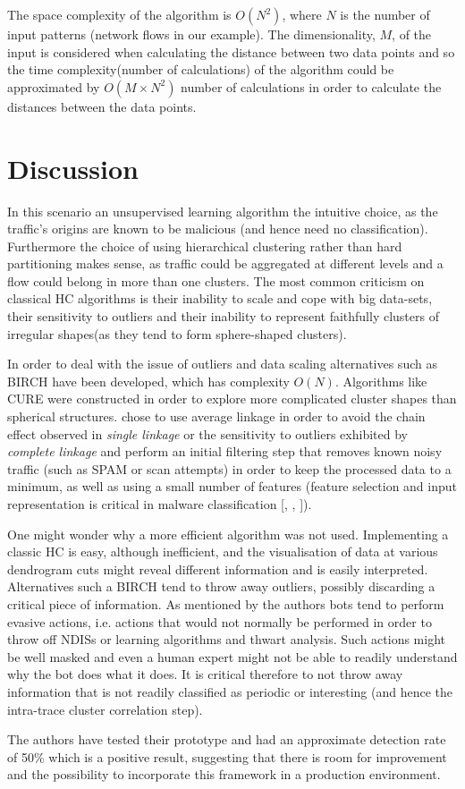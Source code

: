\documentclass[12pt,a4paper,twocolumn]{article}
\begin{document}
	
	The space complexity of the algorithm is $O(N^2)$, where $N$ is the number of input patterns (network flows in our example). The dimensionality, $M$, of the input is considered when calculating the distance between two data points and so the time complexity(number of calculations) of the algorithm  could be approximated by $O(M\times N^2)$ number of calculations in order to calculate the distances between the data points.	
	
	\section{Discussion}
	\label{sec:discussion}
	In this scenario an unsupervised learning algorithm the intuitive choice, as the traffic's origins are known to be malicious (and hence need no classification). Furthermore the choice of using hierarchical clustering rather than hard partitioning makes sense, as traffic could be aggregated at different levels and a flow could belong in more than one clusters. The most common criticism on classical HC algorithms is their inability to scale and cope with big data-sets, their sensitivity to outliers and their inability to represent faithfully clusters of irregular shapes(as they tend to form sphere-shaped clusters).
	
	In order to deal with the issue of outliers and data scaling alternatives such as BIRCH\citep{BIRCH} have been developed, which has complexity $O(N)$. Algorithms like CURE\citep{CURE} were constructed in order to explore more complicated cluster shapes than spherical structures. 	\citeauthor{cavallaro} chose to use average linkage in order to avoid the chain effect observed in \emph{single linkage} or the sensitivity to outliers exhibited by \emph{complete linkage} and perform an initial filtering step that removes known noisy traffic (such as SPAM or scan attempts) in order to keep the processed data to a minimum, as well as using a small number of features (feature selection and input representation is critical in malware classification [\citep{Hou201055}, \citep{IP_classificaton}, \citep{syscalls}]).
	
	One might wonder why a more efficient algorithm was not used. Implementing a classic HC is easy, although inefficient, and the visualisation of data at various dendrogram cuts might reveal different information and is easily interpreted. Alternatives such a BIRCH tend to throw away outliers, possibly discarding a critical piece of information. As mentioned by the authors bots tend to perform evasive actions, i.e. actions that would not normally be performed in order to throw off NDISs or learning algorithms and thwart analysis. Such actions might be well masked and even a human expert might not be able to readily understand why the bot does what it does. It is critical therefore to not throw away information that is not readily classified as periodic or interesting (and hence the intra-trace cluster correlation step).

The authors have tested their prototype and had an approximate detection rate of 50\% which is a positive result, suggesting that there is room for improvement and the possibility to incorporate this framework in a production environment.
	
	
\end{document}
